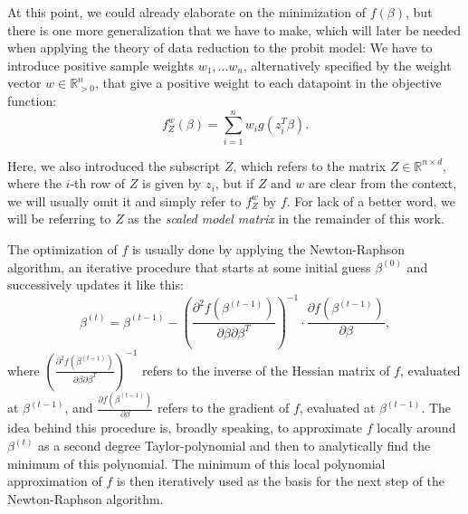 At this point, we could already elaborate on the
minimization of $f(\beta)$, but there is one more
generalization that we have to make, which will
later be needed when applying the theory of data
reduction to the probit model: We have to
introduce positive sample weights $w_1, ... w_n$,
alternatively specified by the weight vector
$w \in \mathbb{R}_{>0}^n$, that give a positive
weight to each datapoint in the objective function:
\begin{equation}
    \label{eq:weighted-objective-function}
    f_Z^w(\beta) = \sum_{i=1}^n w_i g(z_i^T \beta).
\end{equation}

\noindent Here, we also introduced the subscript $Z$,
which refers to the matrix $Z \in \mathbb{R}^{n \times d}$,
where the $i$-th row of $Z$ is given by $z_i$,
but if $Z$ and $w$ are clear from the
context, we will usually omit it and simply refer to
$f_Z^w$ by $f$.
For lack of a better word, we will be referring
to $Z$ as the \textit{scaled model matrix}
in the remainder of this work.

The optimization of $f$ is usually done by applying the
Newton-Raphson algorithm, an iterative procedure that
starts at some initial guess $\beta^{(0)}$ and successively
updates it like this:
\begin{equation}
    \beta^{(t)} = \beta^{(t-1)} - \left(\frac{\partial^2f(\beta^{(t-1)})}{\partial\beta\partial\beta^T}\right)^{-1}
    \cdot \frac{\partial f(\beta^{(t-1)})}{\partial\beta},
\end{equation}
where $\left(\frac{\partial^2f(\beta^{(t-1)})}{\partial\beta\partial\beta^T}\right)^{-1}$
refers to the inverse of the Hessian matrix of $f$, evaluated at
$\beta^{(t-1)}$, and $\frac{\partial f(\beta^{(t-1)})}{\partial\beta}$
refers to the gradient of $f$, evaluated at $\beta^{(t-1)}$.
The idea behind this procedure is, broadly speaking, to approximate
$f$ locally around $\beta^{(t)}$ as a second degree Taylor-polynomial
and then to
analytically find the minimum of this polynomial. The minimum of this
local polynomial approximation of $f$ is then
iteratively used as the basis for the next step of the
Newton-Raphson algorithm.

